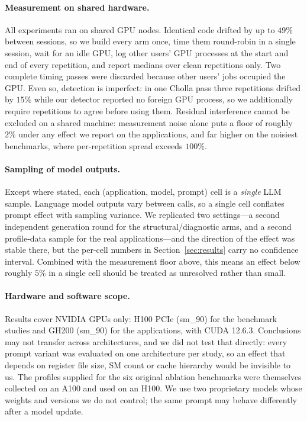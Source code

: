 \paragraph{Measurement on shared hardware.}
All experiments ran on shared GPU nodes. Identical code drifted by up to $49\%$ between sessions, so we
build every arm once, time them round-robin in a single session, wait for an idle GPU, log other users'
GPU processes at the start and end of every repetition, and report medians over clean repetitions only.
Two complete timing passes were discarded because other users' jobs occupied the GPU. Even so,
detection is imperfect: in one Cholla pass three repetitions drifted by $15\%$ while our detector
reported no foreign GPU process, so we additionally require repetitions to agree before using them.
Residual interference cannot be excluded on a shared machine: measurement noise alone puts a floor of
roughly $2\%$ under any effect we report on the applications, and far higher on the noisiest benchmarks,
where per-repetition spread exceeds $100\%$.

\paragraph{Sampling of model outputs.}
Except where stated, each (application, model, prompt) cell is a \emph{single} LLM sample. Language
model outputs vary between calls, so a single cell conflates prompt effect with sampling variance. We
replicated two settings---a second independent generation round for the structural/diagnostic arms, and
a second profile-data sample for the real applications---and the direction of the effect was stable
there, but the per-cell numbers in Section~\ref{sec:results} carry no confidence interval. Combined
with the measurement floor above, this means an effect below roughly $5\%$ in a single cell should be
treated as unresolved rather than small.

\paragraph{Hardware and software scope.}
Results cover NVIDIA GPUs only: H100 PCIe (sm\_90) for the benchmark studies and GH200 (sm\_90) for
the applications, with CUDA 12.6.3. Conclusions may not transfer across architectures, and we did not test that
directly: every prompt variant was evaluated on one architecture per study, so an effect that depends
on register file size, SM count or cache hierarchy would be invisible to us. The profiles supplied for
the six original ablation benchmarks were themselves collected on an A100 and used on an H100. We use two proprietary models whose weights and versions we do not control; the
same prompt may behave differently after a model update.

